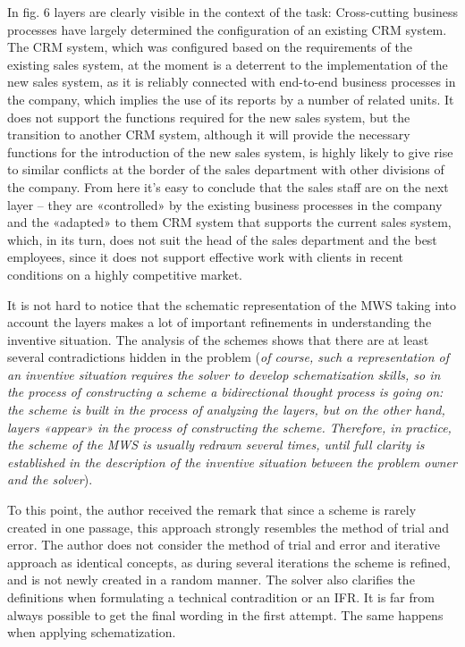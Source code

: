 \documentclass[11pt,a4paper]{book}
\begin{document}
In fig. 6 layers are clearly visible in the context of the task: Cross-cutting
business processes have largely determined the configuration of an existing
CRM system. The CRM system, which was configured based on the requirements of
the existing sales system, at the moment is a deterrent to the implementation
of the new sales system, as it is reliably connected with end-to-end business
processes in the company, which implies the use of its reports by a number of
related units. It does not support the functions required for the new sales
system, but the transition to another CRM system, although it will provide the
necessary functions for the introduction of the new sales system, is highly
likely to give rise to similar conflicts at the border of the sales department
with other divisions of the company. From here it’s easy to conclude that the
sales staff are on the next layer -- they are «controlled» by the existing
business processes in the company and the «adapted» to them CRM system that
supports the current sales system, which, in its turn, does not suit the head
of the sales department and the best employees, since it does not support
effective work with clients in recent conditions on a highly competitive
market.

It is not hard to notice that the schematic representation of the MWS taking
into account the layers makes a lot of important refinements in understanding
the inventive situation. The analysis of the schemes shows that there are at
least several contradictions hidden in the problem (\emph{of course, such a
  representation of an inventive situation requires the solver to develop
  schematization skills, so in the process of constructing a scheme a
  bidirectional thought process is going on: the scheme is built in the
  process of analyzing the layers, but on the other hand, layers «appear» in
  the process of constructing the scheme. Therefore, in practice, the scheme
  of the MWS is usually redrawn several times, until full clarity is
  established in the description of the inventive situation between the
  problem owner and the solver}).

To this point, the author received the remark that since a scheme is rarely
created in one passage, this approach strongly resembles the method of trial
and error. The author does not consider the method of trial and error and
iterative approach as identical concepts, as during several iterations the
scheme is refined, and is not newly created in a random manner.  The solver
also clarifies the definitions when formulating a technical contradition or an
IFR.  It is far from always possible to get the final wording in the first
attempt. The same happens when applying schematization.
\end{document}
